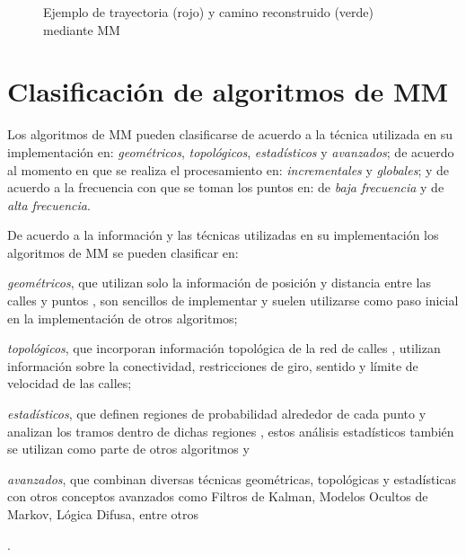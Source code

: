 \begin{figure}[h]
	\centering
	
	\caption[Trayectoria y camino reconstruido mediante MM]{Ejemplo de trayectoria (rojo) y camino reconstruido (verde) mediante MM}
	\label{fig:map-matching} 
\end{figure}

\section{Clasificación de algoritmos de MM}

Los algoritmos de MM pueden clasificarse de acuerdo a la técnica utilizada en su implementación en: \emph{geométricos}, \emph{topológicos}, \emph{estadísticos} y \emph{avanzados}; de acuerdo al momento en que se realiza el procesamiento en: \emph{incrementales} y \emph{globales}; y de acuerdo a la frecuencia con que se toman los puntos en: de \emph{baja frecuencia} y de \emph{alta frecuencia}.

De acuerdo a la información y las técnicas utilizadas en su implementación los algoritmos de MM se pueden clasificar en: \begin{enumerate*}[1)]\item \emph{geométricos}, que utilizan solo la información de posición y distancia entre las calles y puntos \cite{white2000some}, son sencillos de implementar y suelen utilizarse como paso inicial en la implementación de otros algoritmos; \item \emph{topológicos}, que incorporan información topológica de la red de calles \cite{lou2009map,yuan2010interactive,greenfeld2002matching,quddus2003general}, utilizan información sobre la conectividad, restricciones de giro, sentido y límite de velocidad de las calles; \item \emph{estadísticos}, que definen regiones de probabilidad alrededor de cada punto y analizan los tramos dentro de dichas regiones \cite{ochieng2009map}, estos análisis estadísticos también se utilizan como parte de otros algoritmos y \item \emph{avanzados}, que combinan diversas técnicas geométricas, topológicas y estadísticas con otros conceptos avanzados como Filtros de Kalman, Modelos Ocultos de Markov, Lógica Difusa, entre otros \cite{thiagarajan2009vtrack,quddus2006high,thiagarajan2011accurate,fang2011enacq}\end{enumerate*}.

